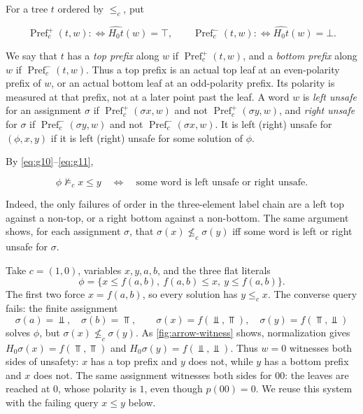 For a tree $t$ ordered by $\le_c$, put

\begin{equation}\label{eq:g12}
\operatorname{Pref}_c^+(t,w):\Longleftrightarrow\widehat{H_0t}(w)=\top,
 \qquad
 \operatorname{Pref}_c^-(t,w):\Longleftrightarrow\widehat{H_0t}(w)=\bot.
\end{equation}

We say that $t$ has a \emph{top prefix} along $w$ if
$\operatorname{Pref}_c^+(t,w)$, and a \emph{bottom prefix} along $w$ if
$\operatorname{Pref}_c^-(t,w)$.
Thus a top prefix is an actual top leaf at an even-polarity prefix of $w$,
or an actual bottom leaf at an odd-polarity prefix. Its polarity is measured
at that prefix, not at a later point past the leaf.
A word $w$ is \emph{left unsafe} for an assignment $\sigma$ if
$\operatorname{Pref}_c^+(\sigma x,w)$ and not $\operatorname{Pref}_c^+(\sigma y,w)$, and
\emph{right unsafe} for $\sigma$ if
$\operatorname{Pref}_c^-(\sigma y,w)$ and not $\operatorname{Pref}_c^-(\sigma x,w)$.
It is left (right) unsafe for $(\phi,x,y)$ if it is left (right) unsafe for
some solution of $\phi$.

By \eqref{eq:g10}--\eqref{eq:g11},

\begin{equation}\label{eq:g13}
\phi\not\models_c x\le y
 \quad\Longleftrightarrow\quad
 \text{some word is left unsafe or right unsafe}.
\end{equation}

Indeed, the only failures of order in the three-element label chain are a
left top against a non-top, or a right bottom against a non-bottom. The same
argument shows, for each assignment $\sigma$, that
$\sigma(x)\not\le_c\sigma(y)$ iff some word is left or right unsafe for
$\sigma$.


\begin{example}\label{ex:running-arrow}
Take $c=(1,0)$, variables $x,y,a,b$, and the three flat literals
\[
 \phi=\{x\le f(a,b),\ f(a,b)\le x,\ y\le f(a,b)\}.
\]
The first two force $x=f(a,b)$, so every solution has $y\le_c x$.
The converse query fails: the finite assignment
\[
 \sigma(a)=\Bot,\quad \sigma(b)=\Top,\qquad
 \sigma(x)=f(\Bot,\Top),\quad \sigma(y)=f(\Top,\Bot)
\]
solves $\phi$, but $\sigma(x)\not\le_c\sigma(y)$.
As \cref{fig:arrow-witness} shows, normalization gives
$H_0\sigma(x)=f(\Top,\Top)$ and $H_0\sigma(y)=f(\Bot,\Bot)$.
Thus $w=0$ witnesses both sides of unsafety: $x$ has a top prefix and
$y$ does not, while $y$ has a bottom prefix and $x$ does not.
The same assignment witnesses both sides for $00$: the leaves are reached
at $0$, whose polarity is $1$, even though $p(00)=0$.
We reuse this system with the failing query $x\le y$ below.
\end{example}

